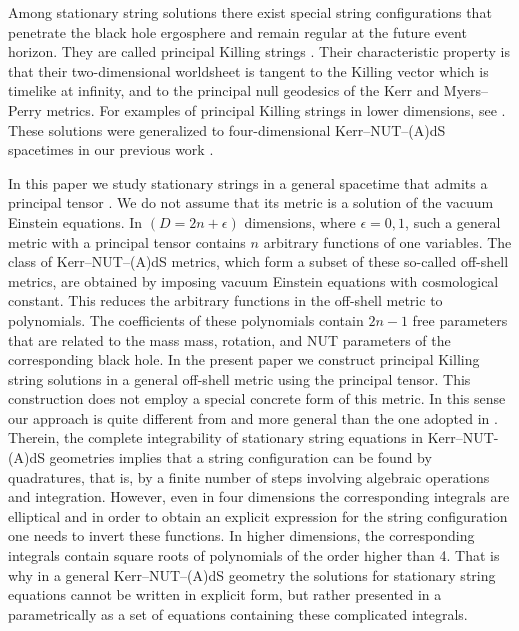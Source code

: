 \documentclass[superscriptaddress,twocolumn,showpacs,
preprintnumbers,amsmath,amssymb,nofootinbib,
longbibliography,aps,prd,10pt]{revtex4-1}
\begin{document}
Among stationary string solutions there exist special string configurations that penetrate the black hole ergosphere and remain regular at the future event horizon. They are called principal Killing strings \cite{Frolov:2004qw}. Their characteristic property is that their two-dimensional worldsheet is tangent to the Killing vector which is timelike at infinity, and to the principal null geodesics of the Kerr \cite{PhysRevD.54.5093} and Myers--Perry \cite{Frolov:2004qw} metrics. For examples of principal Killing strings in lower dimensions, see \cite{Frolov:1995qp,Frolov:1995vp,Frolov:1996be}. These solutions were generalized to four-dimensional Kerr--NUT--(A)dS spacetimes in our previous work \cite{Boos:2017pyd}.

In this paper we study stationary strings in a general spacetime that admits a principal tensor \cite{Frolov:2017kze}. We do not assume that its metric is a solution of the vacuum Einstein equations. In $(D=2n+\epsilon)$ dimensions, where $\epsilon=0,1$, such a general metric with a principal tensor contains $n$ arbitrary functions of one variables. The class of Kerr--NUT--(A)dS metrics, which form a subset of these so-called off-shell metrics, are obtained by imposing vacuum Einstein equations with cosmological constant. This reduces the arbitrary functions in the off-shell metric to polynomials. The coefficients of these polynomials contain $2n-1$ free parameters that are related to the mass mass, rotation, and NUT parameters of the corresponding black hole. In the present paper we construct principal Killing string solutions in a general off-shell metric using the principal tensor. This construction does not employ a special concrete form of this metric. In this sense our approach is quite different from and more general than the one adopted in \cite{Kubiznak:2007ca,Frolov:2004qw}. Therein, the complete integrability of stationary string equations in Kerr--NUT-(A)dS geometries \cite{Kubiznak:2007ca} implies that a string configuration can be found by quadratures, that is, by a finite number of steps involving algebraic operations and integration. However, even in four dimensions the corresponding integrals are elliptical and in order to obtain an explicit expression for the string configuration one needs to invert these functions. In higher dimensions, the corresponding integrals contain square roots of polynomials of the order higher than 4. That is why in a general Kerr--NUT--(A)dS geometry the solutions for stationary string equations cannot be written in explicit form, but rather presented in a parametrically as a set of equations containing these complicated integrals.
\end{document}

